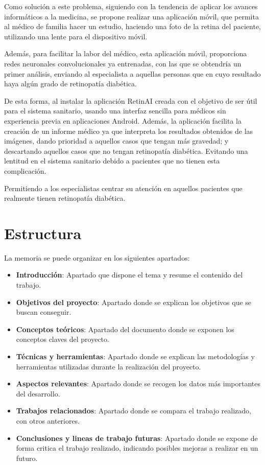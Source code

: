 Como solución a este problema, siguiendo con la tendencia de aplicar los avances informáticos a la medicina, se propone realizar una aplicación móvil, que permita al médico de familia hacer un estudio, haciendo una foto de la retina del paciente, utilizando una lente para el dispositivo móvil. \cite{d-eyecare-lente}

Además, para facilitar la labor del médico, esta aplicación móvil, proporciona redes neuronales convolucionales ya entrenadas, con las que se obtendría un primer análisis, enviando al especialista a aquellas personas que en cuyo resultado haya algún grado de retinopatía diabética. 

De esta forma, al instalar la aplicación RetinAI creada con el objetivo de ser útil para el sistema sanitario, usando una interfaz sencilla para médicos sin experiencia previa en aplicaciones Android. Además, la aplicación facilita la creación de un informe médico ya que interpreta los resultados obtenidos de las imágenes, dando prioridad a aquellos casos que tengan más gravedad; y descartando aquellos casos que no tengan retinopatía diabética. Evitando una lentitud en el sistema sanitario debido a pacientes que no tienen esta complicación. 

Permitiendo a los especialistas centrar su atención en aquellos pacientes que realmente tienen retinopatía diabética.

\section{Estructura}
La memoria se puede organizar en los siguientes apartados:
\begin{itemize}
    \item \textbf{Introducción}: Apartado que dispone el tema y resume el contenido del trabajo.
    \item \textbf{Objetivos del proyecto}: Apartado donde se explican los objetivos que se buscan conseguir.
    \item \textbf{Conceptos teóricos}: Apartado del documento donde se exponen los conceptos claves del proyecto.
    \item \textbf{Técnicas y herramientas}: Apartado donde se explican las metodologías y herramientas utilizadas durante la realización del proyecto.
    \item \textbf{Aspectos relevantes}: Apartado donde se recogen los datos más importantes del desarrollo.
    \item \textbf{Trabajos relacionados}: Apartado donde se compara el trabajo realizado, con otros anteriores.
    \item \textbf{Conclusiones y lineas de trabajo futuras}: Apartado donde se expone de forma critica el trabajo realizado, indicando posibles mejoras a realizar en un futuro.
\end{itemize}

